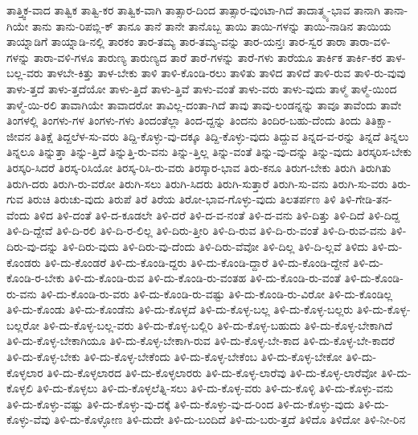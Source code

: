 {ತಾತ್ತ್ವಿಕ-ವಾದ
ತಾತ್ವಿಕ
ತಾತ್ವಿ-ಕರ
ತಾತ್ವಿಕ-ವಾಗಿ
ತಾತ್ಸಾರ-ದಿಂದ
ತಾತ್ಸಾರ-ವುಂಟಾ-ಗಿದೆ
ತಾದಾತ್ಮ್ಯ-ಭಾವ
ತಾನಾಗಿ
ತಾನಾ-ಗಿಯೇ
ತಾನು
ತಾನು-ರಿಪಬ್ಲಿ-ಕ್
ತಾನೂ
ತಾನೆ
ತಾನೇ
ತಾನೊಬ್ಬ
ತಾಯಿ
ತಾಯಿ-ಗಳನ್ನು
ತಾಯಿ-ನಾಡಿನ
ತಾಯಿಯ
ತಾಯ್ನಾಡಿಗೆ
ತಾಯ್ನಾಡಿ-ನಲ್ಲಿ
ತಾರಕಂ
ತಾರ-ತಮ್ಯ
ತಾರ-ತಮ್ಯ-ವನ್ನು
ತಾರ-ಯನ್ತಃ
ತಾರ-ಸ್ವರ
ತಾರಾ
ತಾರಾ-ವಳಿ-ಗಳನ್ನು
ತಾರಾ-ವಳಿ-ಗಳೂ
ತಾರುಣ್ಯ
ತಾರುಣ್ಯದ
ತಾರೆ
ತಾರೆ-ಗಳನ್ನು
ತಾರೆ-ಗಳು
ತಾರೆಯೂ
ತಾರ್ಕಿಕ
ತಾರ್ಕಿ-ಕರ
ತಾಳ-ಬಲ್ಲ-ವರು
ತಾಳಬೇ-ಕಿತ್ತು
ತಾಳ-ಬೇಕು
ತಾಳಿ
ತಾಳಿ-ಕೊಂಡಿ-ರಲು
ತಾಳಿತು
ತಾಳಿದ
ತಾಳಿದೆ
ತಾಳಿ-ರುವ
ತಾಳಿ-ರು-ವುವು
ತಾಳು-ತ್ತದೆ
ತಾಳು-ತ್ತದೆಯೋ
ತಾಳು-ತ್ತಿದೆ
ತಾಳು-ತ್ತಿವೆ
ತಾಳು-ವಂತೆ
ತಾಳು-ವರು
ತಾಳು-ವುದು
ತಾಳ್ಮೆ
ತಾಳ್ಮೆ-ಯಿಂದ
ತಾಳ್ಮೆ-ಯಿ-ರಲಿ
ತಾವಾಗಿಯೇ
ತಾವಾದರೋ
ತಾವಿಲ್ಲ-ದಂತಾ-ಗಿದೆ
ತಾವು
ತಾವು-ಲಂಡನ್ನನ್ನು
ತಾವೂ
ತಾವೆಂದು
ತಾವೇ
ತಿಂಗಳಲ್ಲಿ
ತಿಂಗಳು-ಗಳ
ತಿಂಗಳು-ಗಳು
ತಿಂದಂತೆಲ್ಲಾ
ತಿಂದ-ದ್ದನ್ನು
ತಿಂದನು
ತಿಂದಿರ-ಬಹು-ದೆಂದು
ತಿಂದು
ತಿತಿಕ್ಷಾ-ಜೀವನ
ತಿತಿಕ್ಷೆ
ತಿದ್ದಲೆಳ-ಸು-ವರು
ತಿದ್ದಿ-ಕೊಳ್ಳು-ವು-ದಕ್ಕೂ
ತಿದ್ದಿ-ಕೊಳ್ಳು-ವುದು
ತಿದ್ದುವ
ತಿನ್ನದ-ವ-ರನ್ನು
ತಿನ್ನದೆ
ತಿನ್ನಲು
ತಿನ್ನಲೂ
ತಿನ್ನುತ್ತಾ
ತಿನ್ನು-ತ್ತಿದೆ
ತಿನ್ನುತ್ತಿ-ರು-ವನು
ತಿನ್ನು-ತ್ತಿಲ್ಲ
ತಿನ್ನು-ವಂತೆ
ತಿನ್ನು-ವು-ದನ್ನು
ತಿನ್ನು-ವುದು
ತಿರಸ್ಕರಿಸ-ಬೇಕು
ತಿರಸ್ಕರಿ-ಸಿದರೆ
ತಿರಸ್ಕ-ರಿಸಿಯೋ
ತಿರಸ್ಕ-ರಿಸಿ-ರು-ವರು
ತಿರಸ್ಕಾರ-ಭಾವ
ತಿರು-ಕನೂ
ತಿರುಗ-ಬೇಕು
ತಿರುಗಿ
ತಿರುಗಿತು
ತಿರುಗಿ-ದರು
ತಿರುಗಿ-ರು-ವರೋ
ತಿರುಗಿ-ಸಲು
ತಿರುಗಿ-ಸಿದರು
ತಿರುಗಿ-ಸುತ್ತಾರೆ
ತಿರುಗಿ-ಸು-ವನು
ತಿರುಗಿ-ಸು-ವರು
ತಿರು-ಗುವ
ತಿರುಚಿ
ತಿರುಚು-ವುದು
ತಿರುಪೆ
ತಿರೆ
ತಿರೆಯ
ತಿರೋ-ಭಾವ-ಗೊಳ್ಳು-ವುದು
ತಿಲತರ್ಪಣ
ತಿಳಿ
ತಿಳಿ-ಗೇಡಿ-ತನ-ವೆಂದು
ತಿಳಿದ
ತಿಳಿ-ದಂತೆ
ತಿಳಿ-ದ-ಕೂಡಲೇ
ತಿಳಿ-ದರೆ
ತಿಳಿ-ದ-ವ-ನಂತೆ
ತಿಳಿ-ದ-ವನು
ತಿಳಿ-ದಿತ್ತು
ತಿಳಿ-ದಿದೆ
ತಿಳಿ-ದಿದ್ದ
ತಿಳಿ-ದಿ-ದ್ದೇವೆ
ತಿಳಿ-ದಿ-ರಲಿ
ತಿಳಿ-ದಿ-ರ-ಲಿಲ್ಲ
ತಿಳಿ-ದಿರು-ತ್ತೀರಿ
ತಿಳಿ-ದಿ-ರುವ
ತಿಳಿ-ದಿ-ರು-ವಂತೆ
ತಿಳಿ-ದಿ-ರುವ-ವನು
ತಿಳಿ-ದಿರು-ವು-ದನ್ನು
ತಿಳಿ-ದಿರು-ವುದು
ತಿಳಿ-ದಿರು-ವು-ದೆಂದು
ತಿಳಿ-ದಿರು-ವೆವೋ
ತಿಳಿ-ದಿಲ್ಲ
ತಿಳಿ-ದಿ-ಲ್ಲವೆ
ತಿಳಿದು
ತಿಳಿ-ದು-ಕೊಂಡರು
ತಿಳಿ-ದು-ಕೊಂಡರೆ
ತಿಳಿ-ದು-ಕೊಂಡಿ-ದ್ದರು
ತಿಳಿ-ದು-ಕೊಂಡಿ-ದ್ದಾರೆ
ತಿಳಿ-ದು-ಕೊಂಡಿ-ದ್ದೇನೆ
ತಿಳಿ-ದು-ಕೊಂಡಿ-ರ-ಬೇಕು
ತಿಳಿ-ದು-ಕೊಂಡಿ-ರುವ
ತಿಳಿ-ದು-ಕೊಂಡಿ-ರು-ವಂತಹ
ತಿಳಿ-ದು-ಕೊಂಡಿ-ರು-ವಂತೆ
ತಿಳಿ-ದು-ಕೊಂಡಿ-ರು-ವನು
ತಿಳಿ-ದು-ಕೊಂಡಿ-ರು-ವರು
ತಿಳಿ-ದು-ಕೊಂಡಿ-ರು-ವಷ್ಟು
ತಿಳಿ-ದು-ಕೊಂಡಿ-ರು-ವಿರೋ
ತಿಳಿ-ದು-ಕೊಂಡಿಲ್ಲ
ತಿಳಿ-ದು-ಕೊಂಡು
ತಿಳಿ-ದು-ಕೊಂಡೆನು
ತಿಳಿ-ದು-ಕೊಳ್ಳದೆ
ತಿಳಿ-ದು-ಕೊಳ್ಳ-ಬಲ್ಲ
ತಿಳಿ-ದು-ಕೊಳ್ಳ-ಬಲ್ಲರು
ತಿಳಿ-ದು-ಕೊಳ್ಳ-ಬಲ್ಲರೋ
ತಿಳಿ-ದು-ಕೊಳ್ಳ-ಬಲ್ಲ-ವರು
ತಿಳಿ-ದು-ಕೊಳ್ಳ-ಬಲ್ಲಿರಿ
ತಿಳಿ-ದು-ಕೊಳ್ಳ-ಬಹುದು
ತಿಳಿ-ದು-ಕೊಳ್ಳ-ಬೇಕಾಗಿದೆ
ತಿಳಿ-ದು-ಕೊಳ್ಳ-ಬೇಕಾಗಿಯೂ
ತಿಳಿ-ದು-ಕೊಳ್ಳ-ಬೇಕಾಗಿ-ರುವ
ತಿಳಿ-ದು-ಕೊಳ್ಳ-ಬೇ-ಕಾದ
ತಿಳಿ-ದು-ಕೊಳ್ಳ-ಬೇ-ಕಾದರೆ
ತಿಳಿ-ದು-ಕೊಳ್ಳ-ಬೇಕು
ತಿಳಿ-ದು-ಕೊಳ್ಳ-ಬೇಕೆಂದು
ತಿಳಿ-ದು-ಕೊಳ್ಳ-ಬೇಕೆಂಬ
ತಿಳಿ-ದು-ಕೊಳ್ಳ-ಬೇಕೋ
ತಿಳಿ-ದು-ಕೊಳ್ಳಲಾರ
ತಿಳಿ-ದು-ಕೊಳ್ಳಲಾರದ
ತಿಳಿ-ದು-ಕೊಳ್ಳಲಾರರು
ತಿಳಿ-ದು-ಕೊಳ್ಳ-ಲಾರೆವು
ತಿಳಿ-ದು-ಕೊಳ್ಳ-ಲಾರೆವೋ
ತಿಳಿ-ದು-ಕೊಳ್ಳಲಿ
ತಿಳಿ-ದು-ಕೊಳ್ಳಲು
ತಿಳಿ-ದು-ಕೊಳ್ಳಲೆತ್ನಿ-ಸಲು
ತಿಳಿ-ದು-ಕೊಳ್ಳ-ವರು
ತಿಳಿ-ದು-ಕೊಳ್ಳಿ
ತಿಳಿ-ದು-ಕೊಳ್ಳು-ವನು
ತಿಳಿ-ದು-ಕೊಳ್ಳು-ವಷ್ಟು
ತಿಳಿ-ದು-ಕೊಳ್ಳು-ವು-ದಕ್ಕೆ
ತಿಳಿ-ದು-ಕೊಳ್ಳು-ವು-ದ-ರಿಂದ
ತಿಳಿ-ದು-ಕೊಳ್ಳು-ವುದು
ತಿಳಿ-ದು-ಕೊಳ್ಳು-ವೆವು
ತಿಳಿ-ದು-ಕೊಳ್ಳೋಣ
ತಿಳಿ-ದುದೇ
ತಿಳಿ-ದು-ಬಂದಿದೆ
ತಿಳಿ-ದು-ಬರು-ತ್ತದೆ
ತಿಳಿದೊ
ತಿಳಿದೋ
ತಿಳಿ-ನೀ-ರಿನ
}
